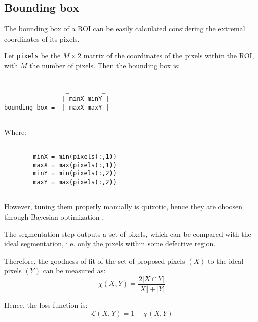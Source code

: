     \subsection{Bounding box}\label{subsection:bounding_box}
        \par{
            The bounding box of a ROI can be easily calculated considering the extremal coordinates of its pixels.
        }
        \par{
            Let \texttt{pixels} be the $M \times 2$ matrix of the coordinates of the pixels within the ROI, with $M$ the number of pixels. Then the bounding box is: 
        }
        \par{
            \begin{BVerbatim}

                 _         _         
                | minX minY |
bounding_box =  | maxX maxY |
                 -         - 
            \end{BVerbatim}
        }
        \par{
            Where:
        }
        \par{
            \begin{BVerbatim} 

        minX = min(pixels(:,1))
        maxX = max(pixels(:,1))
        minY = min(pixels(:,2))
        maxY = max(pixels(:,2))
   
            \end{BVerbatim}
        }
	    \par{
	    	However, tuning them properly manually is quixotic, hence they are choosen through Bayesian optimization \cite{arXiv:2012arXiv1206.2944S,arXiv:2018arXiv180702811F, matlab:bayesian-opt}.
	    }
	    \par{
	    	The segmentation step outputs a set of pixels, which can be compared with the ideal segmentation, i.e. only the pixels within some defective region.
	    }
	    \par{
	    	Therefore, the goodness of fit of the set of proposed pixels $\left(X\right)$ to the ideal pixels $\left(Y\right)$ can be measured as:
	    	\begin{equation*}
	    	\chi\left(X, Y\right) = \frac{2 \lvert X \cap Y \rvert}{\lvert X \rvert + \lvert Y \rvert}
	    	\end{equation*}
	    }
	    \par{
	    	Hence, the loss function is:
	    	\begin{equation*}
	    	\mathcal{L}\left(X, Y\right) = 1 - \chi\left(X, Y\right)
	    	\end{equation*}
	    }
